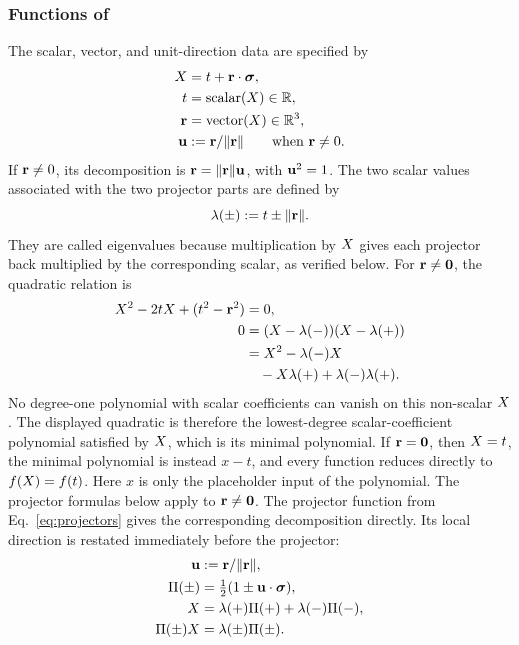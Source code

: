 \subsubsection{Functions of }
The scalar, vector, and unit-direction data are specified by
\begin{align*}
\pv{X} &= t + \vct{r}\cdot\sigv, \\
t &= \eqfunc{scalar}(\pv{X})\in\R, \\
\vct{r} &= \eqfunc{vector}(\pv{X})\in\R^{3}, \\
\vct{u} &:= \vct{r}/\lVert\vct{r}\rVert \qquad \text{when }\vct{r}\neq 0.
\end{align*}
If \(\mathbf{r}\neq 0\), its decomposition is
\(\mathbf{r}=\lVert\mathbf{r}\rVert \mathbf{u}\), with \(\mathbf{u}^{2}=1\).
The two scalar values associated with the two projector parts are defined by
\begin{equation}
\lambda(\pm):=t\pm\lVert\mathbf{r}\rVert.
\label{eq:real-paravector-eigenvalues}
\end{equation}
They are called eigenvalues because multiplication by \(X\) gives each
projector back multiplied by the corresponding scalar, as verified below.
For \(\mathbf{r}\neq\mathbf{0}\), the quadratic relation is
\begin{align*}
X^{2} - 2 t X + ( t^{2} - \mathbf{r}^{2} ) &= 0,\notag \\
0 &= (X-\lambda(-))(X-\lambda(+))\notag \\
&= X^{2} - \lambda(-)X\notag \\
&\quad - X\lambda(+) + \lambda(-)\lambda(+).
\end{align*}
No degree-one polynomial with scalar coefficients can vanish on this
non-scalar \(X\). The displayed quadratic is therefore the
lowest-degree scalar-coefficient polynomial satisfied by \(X\), which
is its minimal polynomial. If \(\mathbf{r}=\mathbf{0}\), then \(X=t\), the
minimal polynomial is instead \(x-t\), and every function reduces directly
to \(f(X)=f(t)\). Here \(x\) is only the placeholder input of the
polynomial. The projector formulas below apply to
\(\mathbf{r}\neq\mathbf{0}\).
The projector function from Eq.\ \eqref{eq:projectors} gives the
corresponding decomposition directly. Its local direction is restated
immediately before the projector:
\begin{align*}
\mathbf{u} &:= \mathbf{r}/\lVert\mathbf{r}\rVert,\\
\Pi(\pm) &= \tfrac12(1\pm \mathbf{u}\cdot\mathbf{\bm{\sigma}}), \\
X &= \lambda(+)\Pi(+)
+\lambda(-)\Pi(-), \\
\Pi(\pm)X &= \lambda(\pm)\Pi(\pm).
\end{align*}
